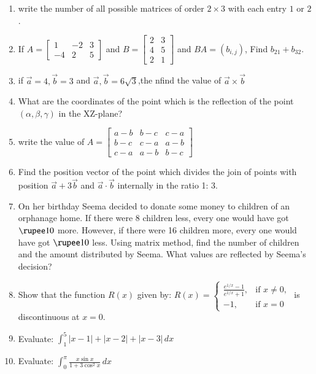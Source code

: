 \documentclass[12pt,-letter paper]{article}
\providecommand{\myvec}[1]{\ensuremath{\begin{bmatrix}#1\end{bmatrix}}}
\begin{document}
\begin{enumerate}
\item write the number of all possible matrices of order \(2 \times 3\) with each entry  \(1\) or \(2\).
\item If $A=\myvec{1 & -2 & 3 \\ -4 & 2 & 5 }$ and $B=\myvec{2 & 3  \\ 4 & 5 \\ 2 & 1}$ and $BA=(b_{i,j})$, Find $b_{21}+b_{32}$.
\item if $\overrightarrow{a}=4,\overrightarrow{b}=3$ and $\overrightarrow{a},\overrightarrow{b}=6\sqrt{3}$,the nfind the value of $\overrightarrow{a}\times\overrightarrow{b}$

\item What are the coordinates of the point which is the reflection of the point \((\alpha, \beta, \gamma)\) in the XZ-plane?
\item write the value of $A=\myvec{a-b & b-c & c-a \\ b-c & c-a & a-b \\ c-a & a-b & b-c}$

\item Find the position vector of the point which divides the join of points with position $\overrightarrow{a}+3\overrightarrow{b}$ and $\overrightarrow{a} \cdot \overrightarrow{b}$ internally in the ratio 1: 3.

\item  On her birthday Seema decided to donate some money to children of an orphanage home. If there were 8 children less, every one would have got $\rupee10$ more. However, if there were 16 children more, every one would have got $\rupee10$ less. Using matrix method, find the number of children and the amount distributed by Seema. What values are reflected by Seema's decision?

\item Show that the function \( R(x) \) given by:
$
R(x) = 
\begin{cases} 
      \frac{e^{1/x} - 1}{e^{1/x} + 1}, & \text{if } x \neq 0, \\
      -1, & \text{if } x = 0 
\end{cases}
$
is discontinuous at \( x = 0 \).

\item Evaluate: 
$
\int_1^5 |x - 1| + |x - 2| + |x - 3| \, dx
$

\item Evaluate: 
$
\int_0^{\pi} \frac{x \sin x}{1 + 3\cos^2 x} \, dx
$


\end{enumerate}
\end{document}
